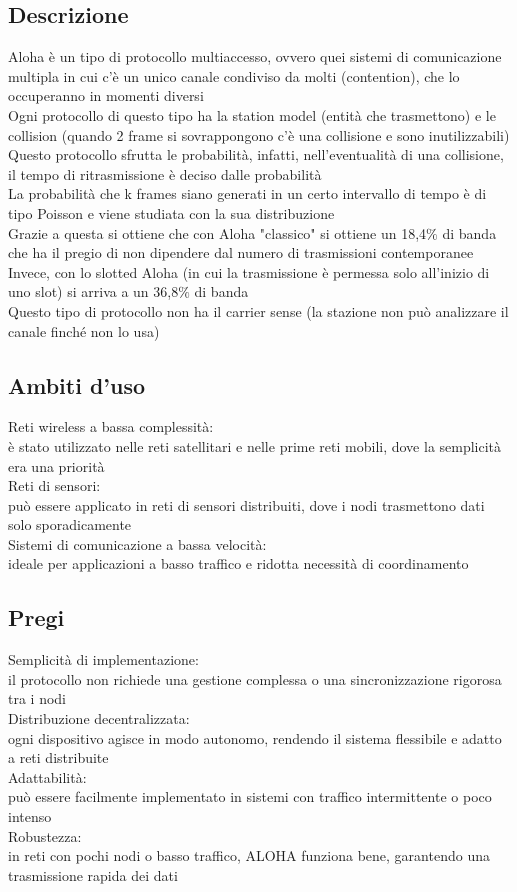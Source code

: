 \documentclass[10pt,oneside,a4paper]{article}
\begin{document}
\subsection{Descrizione}
Aloha è un tipo di protocollo multiaccesso, ovvero quei sistemi di comunicazione multipla in cui c'è un unico canale condiviso da molti (contention), che lo occuperanno in momenti diversi\\
Ogni protocollo di questo tipo ha la station model (entità che trasmettono) e le collision (quando 2 frame si sovrappongono c'è una collisione e sono inutilizzabili)\\
Questo protocollo sfrutta le probabilità, infatti, nell'eventualità di una collisione, il tempo di ritrasmissione è deciso dalle probabilità\\
La probabilità che k frames siano generati in un certo intervallo di tempo è di tipo Poisson e viene studiata con la sua distribuzione\\
Grazie a questa si ottiene che con Aloha "classico" si ottiene un 18,4$\%$ di banda che ha il pregio di non dipendere dal numero di trasmissioni contemporanee\\
Invece, con lo slotted Aloha (in cui la trasmissione è permessa solo all'inizio di uno slot) si arriva a un 36,8$\%$ di banda\\
Questo tipo di protocollo non ha il carrier sense (la stazione non può analizzare il canale finché non lo usa)
\subsection{Ambiti d'uso}
Reti wireless a bassa complessità:\\
è stato utilizzato nelle reti satellitari e nelle prime reti mobili, dove la semplicità era una priorità\\
Reti di sensori:\\
può essere applicato in reti di sensori distribuiti, dove i nodi trasmettono dati solo sporadicamente\\
Sistemi di comunicazione a bassa velocità:\\
ideale per applicazioni a basso traffico e ridotta necessità di coordinamento
\subsection{Pregi}
Semplicità di implementazione:\\
il protocollo non richiede una gestione complessa o una sincronizzazione rigorosa tra i nodi\\
Distribuzione decentralizzata:\\
ogni dispositivo agisce in modo autonomo, rendendo il sistema flessibile e adatto a reti distribuite\\
Adattabilità:\\
può essere facilmente implementato in sistemi con traffico intermittente o poco intenso\\
Robustezza:\\
in reti con pochi nodi o basso traffico, ALOHA funziona bene, garantendo una trasmissione rapida dei dati
\end{document}
